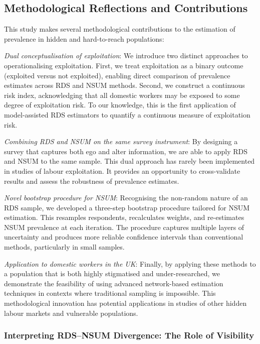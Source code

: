 \documentclass[
  12pt,
  letterpaper,
  DIV=11,
  numbers=noendperiod]{scrartcl}
\theoremstyle{plain}
\theoremstyle{definition}
\begin{document}
\subsection{Methodological Reflections and
Contributions}\label{methodological-reflections-and-contributions}

This study makes several methodological contributions to the estimation
of prevalence in hidden and hard-to-reach populations:

\emph{Dual conceptualisation of exploitation}: We introduce two distinct
approaches to operationalising exploitation. First, we treat
exploitation as a binary outcome (exploited versus not exploited),
enabling direct comparison of prevalence estimates across RDS and NSUM
methods. Second, we construct a continuous risk index, acknowledging
that all domestic workers may be exposed to some degree of exploitation
risk. To our knowledge, this is the first application of model-assisted
RDS estimators to quantify a continuous measure of exploitation risk.

\emph{Combining RDS and NSUM on the same survey instrument}: By
designing a survey that captures both ego and alter information, we are
able to apply RDS and NSUM to the same sample. This dual approach has
rarely been implemented in studies of labour exploitation. It provides
an opportunity to cross-validate results and assess the robustness of
prevalence estimates.

\emph{Novel bootstrap procedure for NSUM}: Recognising the non-random
nature of an RDS sample, we developed a three-step bootstrap procedure
tailored for NSUM estimation. This resamples respondents, recalculates
weights, and re-estimates NSUM prevalence at each iteration. The
procedure captures multiple layers of uncertainty and produces more
reliable confidence intervals than conventional methods, particularly in
small samples.

\emph{Application to domestic workers in the UK}: Finally, by applying
these methods to a population that is both highly stigmatised and
under-researched, we demonstrate the feasibility of using advanced
network-based estimation techniques in contexts where traditional
sampling is impossible. This methodological innovation has potential
applications in studies of other hidden labour markets and vulnerable
populations.

\subsubsection{Interpreting RDS--NSUM Divergence: The Role of
Visibility}\label{interpreting-rdsnsum-divergence-the-role-of-visibility}
\end{document}

